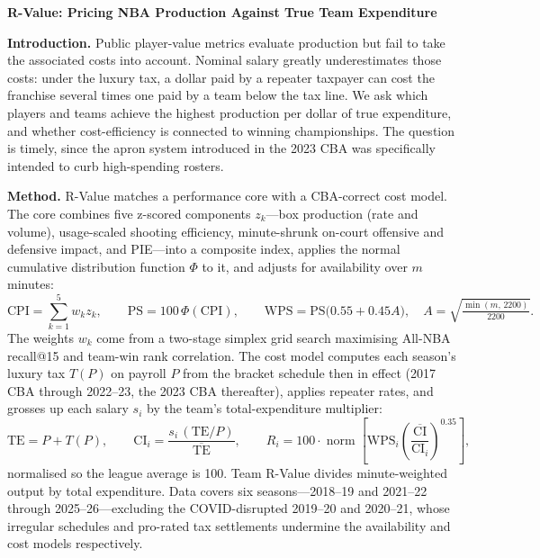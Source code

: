 \documentclass[11pt]{article}
\begin{document}
\begin{center}
{\large\bfseries R-Value: Pricing NBA Production Against True Team Expenditure}
\end{center}
\vspace{2pt}

\textbf{Introduction.} Public player-value metrics evaluate production but fail
to take the associated costs into account. Nominal salary greatly underestimates
those costs: under the luxury tax, a dollar paid by a repeater taxpayer can cost
the franchise several times one paid by a team below the tax line. We ask which
players and teams achieve the highest production per dollar of true expenditure,
and whether cost-efficiency is connected to winning championships. The question
is timely, since the apron system introduced in the 2023 CBA was specifically
intended to curb high-spending rosters.

\textbf{Method.} R-Value matches a performance core with a CBA-correct cost
model. The core combines five z-scored components $z_k$---box production (rate
and volume), usage-scaled shooting efficiency, minute-shrunk on-court offensive
and defensive impact, and PIE---into a composite index, applies the normal
cumulative distribution function $\Phi$ to it, and adjusts for availability over
$m$ minutes:
\begin{equation*}
\mathrm{CPI}=\sum_{k=1}^{5} w_k z_k,
\qquad
\mathrm{PS}=100\,\Phi(\mathrm{CPI}),
\qquad
\mathrm{WPS}=\mathrm{PS}\bigl(0.55+0.45A\bigr),
\quad A=\sqrt{\tfrac{\min(m,\,2200)}{2200}}.
\end{equation*}
The weights $w_k$ come from a two-stage simplex grid search maximising All-NBA
recall@15 and team-win rank correlation. The cost model computes each season's
luxury tax $T(P)$ on payroll $P$ from the bracket schedule then in effect (2017
CBA through 2022--23, the 2023 CBA thereafter), applies repeater rates, and
grosses up each salary $s_i$ by the team's total-expenditure multiplier:
\begin{equation*}
\mathrm{TE}=P+T(P),
\qquad
\mathrm{CI}_i=\frac{s_i\,(\mathrm{TE}/P)}{\overline{\mathrm{TE}}},
\qquad
R_i=100\cdot\operatorname{norm}\!\left[\mathrm{WPS}_i
\left(\frac{\overline{\mathrm{CI}}}{\mathrm{CI}_i}\right)^{0.35}\right],
\end{equation*}
normalised so the league average is 100. Team R-Value divides minute-weighted
output by total expenditure. Data covers six seasons---2018--19 and 2021--22
through 2025--26---excluding the COVID-disrupted 2019--20 and 2020--21, whose
irregular schedules and pro-rated tax settlements undermine the availability and
cost models respectively.
\end{document}
